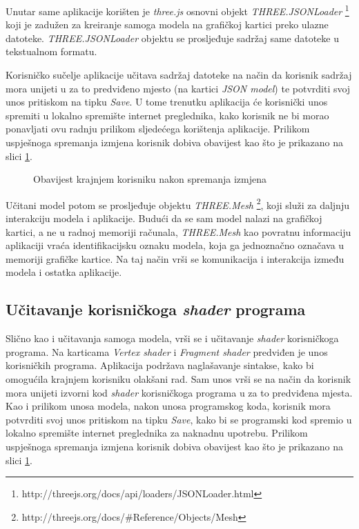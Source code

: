 Unutar same aplikacije korišten je \emph{three.js} osnovni objekt \emph{THREE.JSONLoader} \footnote{http://threejs.org/docs/api/loaders/JSONLoader.html} koji je zadužen za kreiranje samoga modela na grafičkoj kartici preko ulazne datoteke. \emph{THREE.JSONLoader} objektu se prosljeđuje sadržaj same datoteke u tekstualnom formatu.

Korisničko sučelje aplikacije učitava sadržaj datoteke na način da korisnik sadržaj mora unijeti u za to predviđeno mjesto (na kartici \emph{JSON model}) te potvrditi svoj unos pritiskom na tipku \emph{Save}. U tome trenutku aplikacija će korisnički unos spremiti u lokalno spremište internet preglednika, kako korisnik ne bi morao ponavljati ovu radnju prilikom sljedećega korištenja aplikacije. Prilikom uspješnoga spremanja izmjena korisnik dobiva obavijest kao što je prikazano na slici \ref{fig:interface-save}.

\begin{figure}[H]
\centering{}
\caption{Obavijest krajnjem korisniku nakon spremanja izmjena}
\label{fig:interface-save}
\end{figure}

Učitani model potom se prosljeđuje objektu \emph{THREE.Mesh} \footnote{http://threejs.org/docs/\#Reference/Objects/Mesh}, koji služi za daljnju interakciju modela i aplikacije. Budući da se sam model nalazi na grafičkoj kartici, a ne u radnoj memoriji računala, \emph{THREE.Mesh} kao povratnu informaciju aplikaciji vraća identifikacijsku oznaku modela, koja ga jednoznačno označava u memoriji grafičke kartice. Na taj način vrši se komunikacija i interakcija između modela i ostatka aplikacije.

\subsection{Učitavanje korisničkoga \emph{shader} programa}

Slično kao i učitavanja samoga modela, vrši se i učitavanje \emph{shader} korisničkoga programa. Na karticama \emph{Vertex shader} i \emph{Fragment shader} predviđen je unos korisničkih programa. Aplikacija podržava naglašavanje sintakse, kako bi omogućila krajnjem korisniku olakšani rad. Sam unos vrši se na način da korisnik mora unijeti izvorni kod \emph{shader} korisničkoga programa u za to predviđena mjesta. Kao i prilikom unosa modela, nakon unosa programskog koda, korisnik mora potvrditi svoj unos pritiskom na tipku \emph{Save}, kako bi se programski kod spremio u lokalno spremište internet preglednika za naknadnu upotrebu. Prilikom uspješnoga spremanja izmjena korisnik dobiva obavijest kao što je prikazano na slici \ref{fig:interface-save}.

